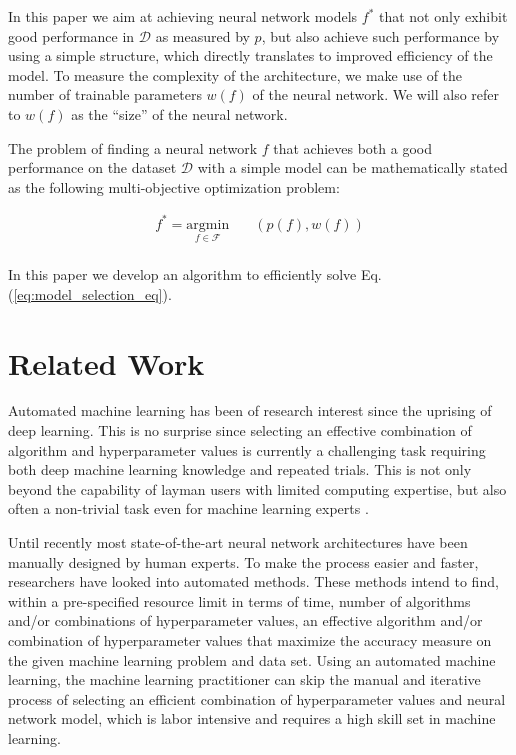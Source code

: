 \documentclass[12pt]{elsart}%
\begin{document}
In this paper we aim at achieving neural network models $f^*$ that not only exhibit good performance in $\mathcal{D}$ as measured by $p$, but also achieve such performance by using a simple structure, which directly translates to improved efficiency of the model. To measure the complexity of the architecture, we make use of the number of trainable parameters $w(f)$ of the neural network. We will also refer to $w(f)$ as the ``size'' of the neural network.

The problem of finding a neural network $f$ that achieves both a good performance on the dataset $\mathcal{D}$ with a simple model can be mathematically stated as the following multi-objective optimization problem:

\begin{equation}
	\begin{aligned}
	f^* = \underset{f \in \mathcal{F}}{\text{argmin}}
	& \quad (p(f), w(f))\\
	\end{aligned}
	\label{eq:model_selection_eq}
\end{equation}

In this paper we develop an algorithm to efficiently solve Eq. (\ref{eq:model_selection_eq}).


\section{Related Work}
\label{sec:literature_review}

Automated machine learning has been of research interest since the uprising of deep learning. This is no surprise since selecting an effective combination of algorithm and hyperparameter values is currently a challenging task requiring both deep machine learning knowledge and repeated trials. This is not only beyond the capability of layman users with limited computing expertise, but also often a non-trivial task even for machine learning experts \cite{sparks2015}. 

Until recently most state-of-the-art neural network architectures have been manually designed by human experts. To make the process easier and faster, researchers have looked into automated methods. These methods intend to find, within a pre-specified resource limit in terms of time, number of algorithms and/or combinations of hyperparameter values, an effective algorithm and/or combination of hyperparameter values that maximize the accuracy measure on the given machine learning problem and data set. Using an automated machine learning, the machine learning practitioner can skip the manual and iterative process of selecting an efficient combination of hyperparameter values and neural network model, which is labor intensive and requires a high skill set in machine learning.
\end{document}
